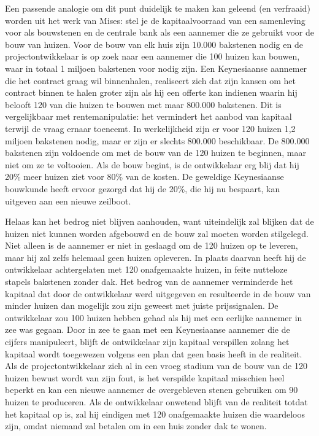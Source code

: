 \documentclass[
  a5paper,
  smalldemyvopaper,11pt,twoside,onecolumn,openright,extrafontsizes,
hidelinks]{memoir}
\begin{document}
Een passende analogie om dit punt duidelijk te maken kan geleend (en
verfraaid) worden uit het werk van Mises: stel je de kapitaalvoorraad
van een samenleving voor als bouwstenen en de centrale bank als een
aannemer die ze gebruikt voor de bouw van huizen. Voor de bouw van elk
huis zijn 10.000 bakstenen nodig en de projectontwikkelaar is op zoek
naar een aannemer die 100 huizen kan bouwen, waar in totaal 1 miljoen
bakstenen voor nodig zijn. Een Keynesiaanse aannemer die het contract
graag wil binnenhalen, realiseert zich dat zijn kansen om het contract
binnen te halen groter zijn als hij een offerte kan indienen waarin hij
belooft 120 van die huizen te bouwen met maar 800.000 bakstenen. Dit is
vergelijkbaar met rentemanipulatie: het vermindert het aanbod van
kapitaal terwijl de vraag ernaar toeneemt. In werkelijkheid zijn er voor
120 huizen 1,2 miljoen bakstenen nodig, maar er zijn er slechts 800.000
beschikbaar. De 800.000 bakstenen zijn voldoende om met de bouw van de
120 huizen te beginnen, maar niet om ze te voltooien. Als de bouw
begint, is de ontwikkelaar erg blij dat hij 20\% meer huizen ziet voor
80\% van de kosten. De geweldige Keynesiaanse bouwkunde heeft ervoor
gezorgd dat hij de 20\%, die hij nu bespaart, kan uitgeven aan een
nieuwe zeilboot.

Helaas kan het bedrog niet blijven aanhouden, want uiteindelijk zal
blijken dat de huizen niet kunnen worden afgebouwd en de bouw zal moeten
worden stilgelegd. Niet alleen is de aannemer er niet in geslaagd om de
120 huizen op te leveren, maar hij zal zelfs helemaal geen huizen
opleveren. In plaats daarvan heeft hij de ontwikkelaar achtergelaten met
120 onafgemaakte huizen, in feite nutteloze stapels bakstenen zonder
dak. Het bedrog van de aannemer verminderde het kapitaal dat door de
ontwikkelaar werd uitgegeven en resulteerde in de bouw van minder huizen
dan mogelijk zou zijn geweest met juiste prijssignalen. De ontwikkelaar
zou 100 huizen hebben gehad als hij met een eerlijke aannemer in zee was
gegaan. Door in zee te gaan met een Keynesiaanse aannemer die de cijfers
manipuleert, blijft de ontwikkelaar zijn kapitaal verspillen zolang het
kapitaal wordt toegewezen volgens een plan dat geen basis heeft in de
realiteit. Als de projectontwikkelaar zich al in een vroeg stadium van
de bouw van de 120 huizen bewust wordt van zijn fout, is het verspilde
kapitaal misschien heel beperkt en kan een nieuwe aannemer de
overgebleven stenen gebruiken om 90 huizen te produceren. Als de
ontwikkelaar onwetend blijft van de realiteit totdat het kapitaal op is,
zal hij eindigen met 120 onafgemaakte huizen die waardeloos zijn, omdat
niemand zal betalen om in een huis zonder dak te wonen.
\end{document}
